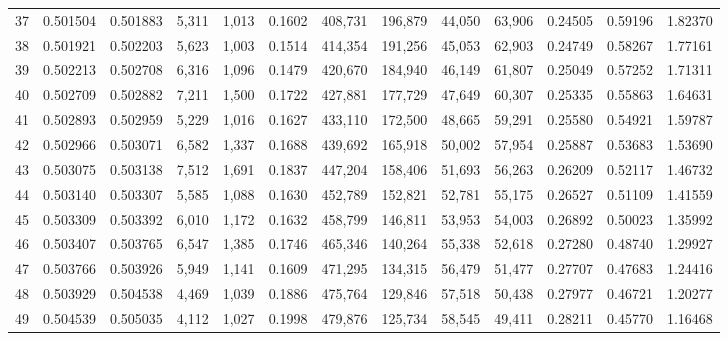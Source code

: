 \begin{tabular}{rrrrrrrrrrrrr}
37 &  0.501504 &  0.501883 &   5,311 &  1,013 &                                     0.1602 &  408,731 &  196,879 &   44,050 &   63,906 &  0.24505 &  0.59196 &  1.82370 \\
38 &  0.501921 &  0.502203 &   5,623 &  1,003 &                                     0.1514 &  414,354 &  191,256 &   45,053 &   62,903 &  0.24749 &  0.58267 &  1.77161 \\
39 &  0.502213 &  0.502708 &   6,316 &  1,096 &                                     0.1479 &  420,670 &  184,940 &   46,149 &   61,807 &  0.25049 &  0.57252 &  1.71311 \\
40 &  0.502709 &  0.502882 &   7,211 &  1,500 &                                     0.1722 &  427,881 &  177,729 &   47,649 &   60,307 &  0.25335 &  0.55863 &  1.64631 \\
41 &  0.502893 &  0.502959 &   5,229 &  1,016 &                                     0.1627 &  433,110 &  172,500 &   48,665 &   59,291 &  0.25580 &  0.54921 &  1.59787 \\
42 &  0.502966 &  0.503071 &   6,582 &  1,337 &                                     0.1688 &  439,692 &  165,918 &   50,002 &   57,954 &  0.25887 &  0.53683 &  1.53690 \\
43 &  0.503075 &  0.503138 &   7,512 &  1,691 &                                     0.1837 &  447,204 &  158,406 &   51,693 &   56,263 &  0.26209 &  0.52117 &  1.46732 \\
44 &  0.503140 &  0.503307 &   5,585 &  1,088 &                                     0.1630 &  452,789 &  152,821 &   52,781 &   55,175 &  0.26527 &  0.51109 &  1.41559 \\
45 &  0.503309 &  0.503392 &   6,010 &  1,172 &                                     0.1632 &  458,799 &  146,811 &   53,953 &   54,003 &  0.26892 &  0.50023 &  1.35992 \\
46 &  0.503407 &  0.503765 &   6,547 &  1,385 &                                     0.1746 &  465,346 &  140,264 &   55,338 &   52,618 &  0.27280 &  0.48740 &  1.29927 \\
47 &  0.503766 &  0.503926 &   5,949 &  1,141 &                                     0.1609 &  471,295 &  134,315 &   56,479 &   51,477 &  0.27707 &  0.47683 &  1.24416 \\
48 &  0.503929 &  0.504538 &   4,469 &  1,039 &                                     0.1886 &  475,764 &  129,846 &   57,518 &   50,438 &  0.27977 &  0.46721 &  1.20277 \\
49 &  0.504539 &  0.505035 &   4,112 &  1,027 &                                     0.1998 &  479,876 &  125,734 &   58,545 &   49,411 &  0.28211 &  0.45770 &  1.16468 \\

\end{tabular}

